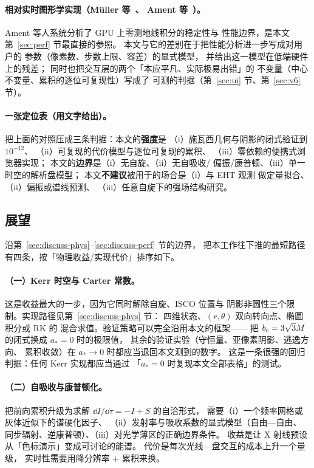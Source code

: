 \paragraph{相对实时图形学实现（Müller 等~\cite{muller2010,muller2014}、
Ament 等~\cite{ament2015}）。}
Ament 等人系统分析了 GPU 上零测地线积分的稳定性与
性能边界，是本文第~\ref{sec:perf} 节最直接的参照。
本文与它的差别在于把性能分析进一步写成对用户的
参数（像素数、步数上限、容差）的显式模型，
并给出这一模型在低端硬件上的残差；
同时也把交互层的两个「本应平凡、实际极易出错」的
不变量（中心不变量、累积的逐位可复现性）写成了
可测的判据（第~\ref{sec:ui} 节、第~\ref{sec:v6} 节）。

\paragraph{一张定位表（用文字给出）。}
把上面的对照压成三条判据：本文的\textbf{强度}是
（i）施瓦西几何与阴影的闭式验证到 $10^{-12}$、
（ii）可复现的代价模型与逐位可复现的累积、
（iii）零依赖的便携式浏览器实现；
本文的\textbf{边界}是（i）无自旋、（ii）无自吸收/
偏振/康普顿、（iii）单一时空的解析盘模型；
本文\textbf{不建议}被用于的场合是（i）与 EHT 观测
做定量拟合、（ii）偏振或谱线预测、
（iii）任意自旋下的强场结构研究。

\subsection{展望}\label{sec:discuss-future}

沿第~\ref{sec:discuss-phys}--\ref{sec:discuss-perf} 节的边界，
把本工作往下推的最短路径有四条，按「物理收益/实现代价」排序如下。

\paragraph{（一）Kerr 时空与 Carter 常数。}
这是收益最大的一步，因为它同时解除自旋、ISCO 位置与
阴影非圆性三个限制。实现路径见第~\ref{sec:discuss-phys} 节：
四维状态、$(r,\theta)$ 双向转向点、椭圆积分或 RK 的
混合求值。验证策略可以完全沿用本文的框架——
把 $b_{c}=3\sqrt3M$ 的闭式换成 $a_\ast=0$ 时的极限值，
其余的验证实验（守恒量、亚像素阴影、逃逸方向、
累积收敛）在 $a_\ast\to0$ 时都应当退回本文测到的数字。
这是一条很强的回归判据：任何 Kerr 实现都应当通过
「$a_\ast=0$ 时复现本文全部表格」的测试。

\paragraph{（二）自吸收与康普顿化。}
把前向累积升级为求解 $\dd I/\dd\tau=-I+S$ 的自洽形式，
需要（i）一个频率网格或灰体近似下的谱硬化因子、
（ii）发射率与吸收系数的显式模型（自由—自由、
同步辐射、逆康普顿）、（iii）对光学薄区的正确边界条件。
收益是让 X 射线预设从「色标演示」变成可讨论的能谱。
代价是每次光线—盘交互的成本上升一个量级，
实时性需要用降分辨率 + 累积来换。

